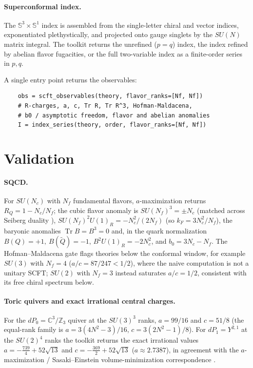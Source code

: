 \documentclass[11.5pt]{scrartcl}
\newcommand{\tr}{\operatorname{Tr}}
\newcommand{\Nc}{N_c}
\newcommand{\Nf}{N_f}
\begin{document}
\paragraph{Superconformal index.}
The $\mathbb{S}^3\times\mathbb{S}^1$ index
\cite{hep-th/0510060,0801.4947,1608.02965} is assembled from the single-letter
chiral and vector indices, exponentiated plethystically, and projected onto
gauge singlets by the $SU(N)$ matrix integral. The toolkit returns the
unrefined ($p=q$) index, the index refined by abelian flavor fugacities, or
the full two-variable index as a finite-order series in $p,q$.

A single entry point returns the observables:
\begin{verbatim}
    obs = scft_observables(theory, flavor_ranks=[Nf, Nf])
    # R-charges, a, c, Tr R, Tr R^3, Hofman-Maldacena,
    # b0 / asymptotic freedom, flavor and abelian anomalies
    I = index_series(theory, order, flavor_ranks=[Nf, Nf])
\end{verbatim}

\section{Validation}

\paragraph{SQCD.}
For $SU(\Nc)$ with $\Nf$ fundamental flavors, $a$-maximization returns
$R_Q=1-\Nc/\Nf$; the cubic flavor anomaly is $SU(\Nf)^3=\pm\Nc$ (matched across
Seiberg duality \cite{hep-th/9411149}), $SU(\Nf)^2 U(1)_R=-\Nc^2/(2\Nf)$ (so
$k_F=3\Nc^2/\Nf$), the baryonic anomalies $\tr B=B^3=0$ and, in the quark
normalization $B(Q)=+1,\ B(\widetilde Q)=-1$, $B^2 U(1)_R=-2\Nc^2$, and
$b_0=3\Nc-\Nf$. The Hofman--Maldacena gate flags theories below the conformal
window, for example $SU(3)$ with $\Nf=4$ ($a/c=87/247<1/2$), where the naive
computation is not a unitary SCFT; $SU(2)$ with $\Nf=3$ instead saturates
$a/c=1/2$, consistent with its free chiral spectrum below.

\paragraph{Toric quivers and exact irrational central charges.}
For the $dP_0=\mathbb{C}^3/\mathbb{Z}_3$ quiver at the $SU(3)^3$ ranks,
$a=99/16$ and $c=51/8$ (the equal-rank family is $a=3(4N^2-3)/16$,
$c=3(2N^2-1)/8$). For $dP_1=Y^{2,1}$ at the $SU(2)^4$ ranks the toolkit
returns the exact irrational values $a=-\tfrac{739}{4}+52\sqrt{13}$ and
$c=-\tfrac{369}{2}+52\sqrt{13}$ ($a\approx 2.7387$), in agreement with the
$a$-maximization / Sasaki--Einstein volume-minimization correspondence
\cite{hep-th/0503183,hep-th/0506232}.
\end{document}
